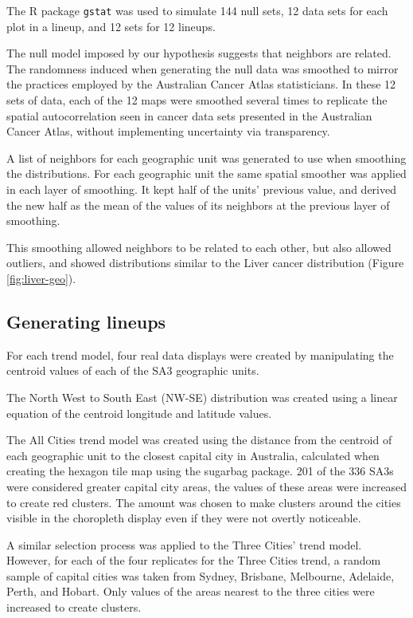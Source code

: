 \documentclass{monashthesis}
\begin{document}
The R package \texttt{gstat} \autocite{gstat} was used to simulate 144 null sets, 12 data sets for each plot in a lineup, and 12 sets for 12 lineups.

The null model imposed by our hypothesis suggests that neighbors are related. The randomness induced when generating the null data was smoothed to mirror the practices employed by the Australian Cancer Atlas statisticians.
In these 12 sets of data, each of the 12 maps were smoothed several times to replicate the spatial autocorrelation seen in cancer data sets presented in the Australian Cancer Atlas, without implementing uncertainty via transparency.

A list of neighbors for each geographic unit was generated to use when smoothing the distributions. For each geographic unit the same spatial smoother was applied in each layer of smoothing. It kept half of the units' previous value, and derived the new half as the mean of the values of its neighbors at the previous layer of smoothing.

This smoothing allowed neighbors to be related to each other, but also allowed outliers, and showed distributions similar to the Liver cancer distribution (Figure \ref{fig:liver-geo}).

\hypertarget{generating-lineups}{%
\subsection{Generating lineups}\label{generating-lineups}}

For each trend model, four real data displays were created by manipulating the centroid values of each of the SA3 geographic units.

The North West to South East (NW-SE) distribution was created using a linear equation of the centroid longitude and latitude values.

The All Cities trend model was created using the distance from the centroid of each geographic unit to the closest capital city in Australia, calculated when creating the hexagon tile map using the sugarbag \autocite{sugarbag} package.
201 of the 336 SA3s were considered greater capital city areas, the values of these areas were increased to create red clusters. The amount was chosen to make clusters around the cities visible in the choropleth display even if they were not overtly noticeable.

A similar selection process was applied to the Three Cities' trend model. However, for each of the four replicates for the Three Cities trend, a random sample of capital cities was taken from Sydney, Brisbane, Melbourne, Adelaide, Perth, and Hobart. Only values of the areas nearest to the three cities were increased to create clusters.
\end{document}
